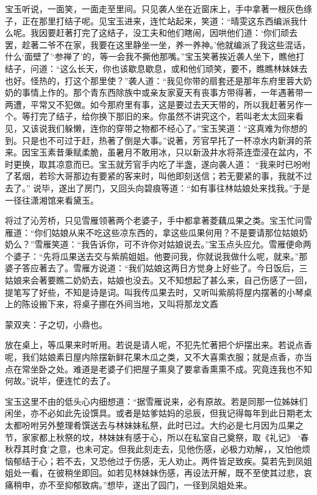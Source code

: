 \begin{parag}
    宝玉听说，一面笑，一面走至里间。只见袭人坐在近窗床上，手中拿著一根灰色绦子，正在那里打结子呢。见宝玉进来，连忙站起来，笑道：“晴雯这东西编派我什么呢。我因要赶著打完了这结子，没工夫和他们瞎闹，因哄他们道：‘你们顽去罢，趁著二爷不在家，我要在这里静坐一坐，养一养神。’他就编派了我这些混话，什么‘面壁了’‘参禅了’的，等一会我不撕他那嘴。”宝玉笑著挨近袭人坐下，瞧他打结子，问道：“这么长天，你也该歇息歇息，或和他们顽笑，要不，瞧瞧林妹妹去也好。怪热的，打这个那里使？”袭人道：“我见你带的扇套还是那年东府里蓉大奶奶的事情上作的。那个青东西除族中或亲友家夏天有丧事方带得著，一年遇著带一两遭，平常又不犯做。如今那府里有事，这是要过去天天带的，所以我赶著另作一个。等打完了结子，给你换下那旧的来。你虽然不讲究这个，若叫老太太回来看见，又该说我们躲懒，连你的穿带之物都不经心了。”宝玉笑道：“这真难为你想的到。只是也不可过于赶，热著了倒是大事。”说著，芳官早托了一杯凉水内新湃的茶来。因宝玉素昔秉赋柔脆，虽暑月不敢用冰，只以新汲井水将茶连壶浸在盆内，不时更换，取其凉意而已。宝玉就芳官手内吃了半盏，遂向袭人道： “我来时已吩咐了茗烟，若珍大哥那边有要紧的客来时，叫他即刻送信；若无要紧的事，我就不过去了。” 说毕，遂出了房门，又回头向碧痕等道：“如有事往林姑娘处来找我。”于是一径往潇湘馆来看黛玉。
\end{parag}


\begin{parag}
    将过了沁芳桥，只见雪雁领著两个老婆子，手中都拿著菱藕瓜果之类。宝玉忙问雪雁道：“你们姑娘从来不吃这些凉东西的，拿这些瓜果何用？不是要请那位姑娘奶奶么？”雪雁笑道：“我告诉你，可不许你对姑娘说去。”宝玉点头应允。雪雁便命两个婆子：“先将瓜果送去交与紫鹃姐姐。他要问我，你就说我做什么呢，就来。”那婆子答应著去了。雪雁方说道：“我们姑娘这两日方觉身上好些了。今日饭后，三姑娘来会著要瞧二奶奶去，姑娘也没去。又不知想起了甚么来，自己伤感了一回，提笔写了好些，不知是诗是词。叫我传瓜果去时，又听叫紫鹃将屋内摆著的小琴桌上的陈设搬下来，将桌子挪在外间当地，又叫将那龙文鼒\begin{note}蒙双夹：子之切，小鼎也。\end{note}放在桌上，等瓜果来时听用。若说是请人呢，不犯先忙著把个炉摆出来。若说点香呢，我们姑娘素日屋内除摆新鲜花果木瓜之类，又不大喜熏衣服；就是点香，亦当点在常坐卧之处。难道是老婆子们把屋子熏臭了要拿香熏熏不成。究竟连我也不知何故。”说毕，便连忙的去了。
\end{parag}


\begin{parag}
    宝玉这里不由的低头心内细想道：“据雪雁说来，必有原故。若是同那一位姊妹们闲坐，亦不必如此先设馔具。或者是姑爹姑妈的忌辰，但我记得每年到此日期老太太都吩咐另外整理肴馔送去与林妹妹私祭，此时已过。大约必是七月因为瓜果之节，家家都上秋祭的坟，林妹妹有感于心，所以在私室自己奠祭，取《礼记》 ‘春秋荐其时食’之意，也未可定。但我此刻走去，见他伤感，必极力劝解，，又怕他烦恼郁结于心；若不去，又恐他过于伤感，无人劝止。两件皆足致疾。莫若先到凤姐姐处一看，在彼稍坐即回。如若见林妹妹伤感，再设法开解，既不至使其过悲，哀痛稍申，亦不至抑郁致病。”想毕，遂出了园门，一径到凤姐处来。
\end{parag}


